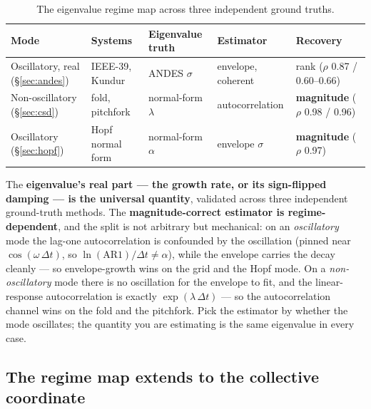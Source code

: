 \documentclass[11pt]{article}
\begin{document}
\begin{table}[h!]
\centering
\footnotesize
\setlength{\tabcolsep}{3.5pt}
\begin{tabular}{lllll}
\toprule
Mode & Systems & Eigenvalue truth & Estimator & Recovery \\
\midrule
Oscillatory, real (\S\ref{sec:andes}) & IEEE-39, Kundur & ANDES $\sigma$ & envelope, coherent & rank ($\rho$ 0.87 / 0.60--0.66) \\
Non-oscillatory (\S\ref{sec:csd}) & fold, pitchfork & normal-form $\lambda$ & autocorrelation & \textbf{magnitude} ($\rho$ 0.98 / 0.96) \\
Oscillatory (\S\ref{sec:hopf}) & Hopf normal form & normal-form $\alpha$ & envelope $\sigma$ & \textbf{magnitude} ($\rho$ 0.97) \\
\bottomrule
\end{tabular}
\caption{The eigenvalue regime map across three independent ground truths.}
\end{table}

The \textbf{eigenvalue's real part --- the growth rate, or its
sign-flipped damping --- is the universal quantity}, validated across
three independent ground-truth methods. The \textbf{magnitude-correct
estimator is regime-dependent}, and the split is not arbitrary but
mechanical: on an \emph{oscillatory} mode the lag-one autocorrelation is
confounded by the oscillation (pinned near $\cos(\omega \, \Delta t)$,
so $\ln(\mathrm{AR1})/\Delta t \ne \alpha$), while the envelope carries
the decay cleanly --- so envelope-growth wins on the grid and the Hopf
mode. On a \emph{non-oscillatory} mode there is no oscillation for the
envelope to fit, and the linear-response autocorrelation is exactly
$\exp(\lambda \, \Delta t)$ --- so the autocorrelation channel wins on
the fold and the pitchfork. Pick the estimator by whether the mode
oscillates; the quantity you are estimating is the same eigenvalue in
every case.

\subsection{The regime map extends to the collective coordinate}\label{sec:kuramoto}
\end{document}
